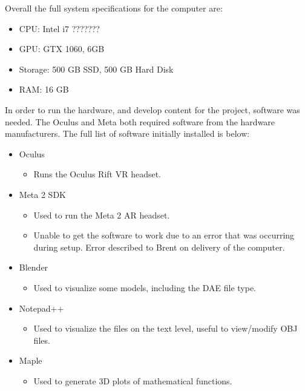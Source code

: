     Overall the full system specifications for the computer are:

    \begin{itemize}
        \item CPU: Intel i7 ???????
        \item GPU: GTX 1060, 6GB
        \item Storage: 500 GB SSD, 500 GB Hard Disk
        \item RAM: 16 GB
    \end{itemize}

    In order to run the hardware, and develop content for the project, software was needed.  The Oculus and Meta both required software from the hardware manufacturers.  The full list of software initially installed is below:

    \begin{itemize}
        \item Oculus
        \begin{itemize}
            \item Runs the Oculus Rift VR headset.
        \end{itemize}
        \item Meta 2 SDK
        \begin{itemize}
            \item Used to run the Meta 2 AR headset.
            \item Unable to get the software to work due to an error that was occurring during setup.  Error described to Brent on delivery of the computer.
        \end{itemize}
        \item Blender
        \begin{itemize}
            \item Used to visualize some models, including the DAE file type.
        \end{itemize}
        \item Notepad++
        \begin{itemize}
            \item Used to visualize the files on the text level, useful to view/modify OBJ files.
        \end{itemize}
        \item Maple
        \begin{itemize}
            \item Used to generate 3D plots of mathematical functions.
        \end{itemize}
    \end{itemize}

